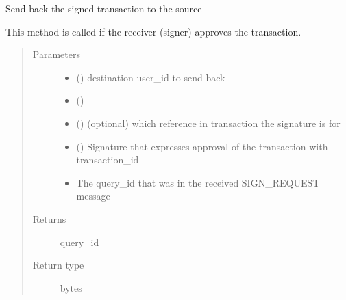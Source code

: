 \documentclass[letterpaper,10pt,english]{sphinxmanual}
\begin{document}
\begin{fulllineitems}
\begin{fulllineitems}
\end{fulllineitems}


\begin{fulllineitems}
\label{\detokenize{bbc1.core.bbc_app:bbc1.core.bbc_app.BBcAppClient.sendback_signature}}
Send back the signed transaction to the source

This method is called if the receiver (signer) approves the transaction.
\begin{quote}\begin{description}
\item[{Parameters}] \leavevmode\begin{itemize}
\item {} 
 () \textendash{} destination user\_id to send back

\item {} 
 () \textendash{} 

\item {} 
 () \textendash{} (optional) which reference in transaction the signature is for

\item {} 
 ({\hyperref[\detokenize{bbc1.core.bbclib:bbc1.core.bbclib.BBcSignature}]{}}) \textendash{} Signature that expresses approval of the transaction with transaction\_id

\item {} 
 \textendash{} The query\_id that was in the received SIGN\_REQUEST message

\end{itemize}

\item[{Returns}] \leavevmode
query\_id

\item[{Return type}] \leavevmode
bytes


\end{description}
\end{quote}
\end{fulllineitems}
\end{fulllineitems}
\end{document}
